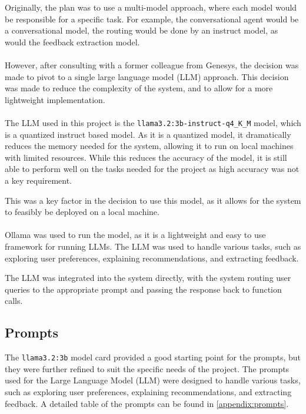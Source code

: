 Originally, the plan was to use a multi-model approach, where each model would be responsible for a specific task. For example, the conversational agent would be a conversational model, the routing would be done by an instruct model, as would the feedback extraction model.
\\\\
However, after consulting with a former colleague from Genesys, the decision was made to pivot to a single large language model (LLM) approach.
This decision was made to reduce the complexity of the system, and to allow for a more lightweight implementation.
\\\\
The LLM used in this project is the \texttt{llama3.2:3b-instruct-q4\_K\_M} model\cite{grattafiori2024llama3herdmodels}, which is a quantized instruct based model.
As it is a quantized model, it dramatically reduces the memory needed for the system, allowing it to run on local machines with limited resources.
While this reduces the accuracy of the model, it is still able to perform well on the tasks needed for the project as high accuracy was not a key requirement. 

This was a key factor in the decision to use this model, as it allows for the system to feasibly be deployed on a local machine.
\\\\
Ollama was used to run the model, as it is a lightweight and easy to use framework for running LLMs.
The LLM was used to handle various tasks, such as exploring user preferences, explaining recommendations, and extracting feedback.

The LLM was integrated into the system directly, with the system routing user queries to the appropriate prompt and passing the response back to function calls.

\subsection{Prompts}
\label{subsec:prompts}
The \texttt{llama3.2:3b} model card provided a good starting point for the prompts, but they were further refined to suit the specific needs of the project.
The prompts used for the Large Language Model (LLM) were designed to handle various tasks, such as exploring user preferences, explaining recommendations, and extracting feedback. A detailed table of the prompts can be found in \cref{appendix:prompts}.

